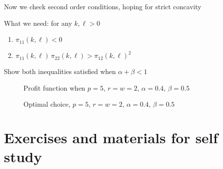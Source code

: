 \documentclass[letterpaper,10pt,english]{jupyterBook}
\begin{document}
\sphinxAtStartPar
Now we check second order conditions, hoping for strict concavity

\sphinxAtStartPar
What we need: for any \(k, \ell > 0\)
\begin{enumerate}
%
\item {} 
\sphinxAtStartPar
\(\pi_{11}(k, \ell) < 0\)

\item {} 
\sphinxAtStartPar
\(\pi_{11}(k, \ell) \, \pi_{22}(k, \ell) >  \pi_{12}(k, \ell)^2\)

\end{enumerate}

\sphinxAtStartPar
{} Show both inequalities satisfied when \(\alpha + \beta < 1\)

\begin{figure}[htbp]
\centering
\capstart

\noindent{}
\caption{Profit function when \(p=5\), \(r=w=2\), \(\alpha=0.4\), \(\beta=0.5\)}\label{\detokenize{02.optimization_intro:id19}}\end{figure}

\begin{figure}[htbp]
\centering
\capstart

\noindent{}
\caption{Optimal choice, \(p=5\), \(r=w=2\), \(\alpha=0.4\), \(\beta=0.5\)}\label{\detokenize{02.optimization_intro:id20}}\end{figure}


\section{Exercises and materials for self study}
\label{\detokenize{02.optimization_intro:exercises-and-materials-for-self-study}}
\sphinxAtStartPar
{\hyperref[\detokenize{02.exercises::doc}]{}}

\sphinxstepscope
\end{document}
